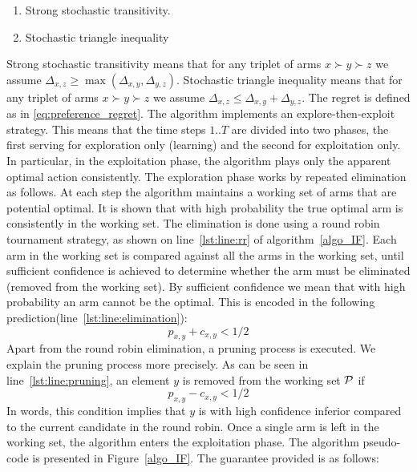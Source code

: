 \documentclass{llncs}
\begin{document}
	\begin{enumerate}

		\item Strong stochastic transitivity.

		\item Stochastic triangle inequality

	\end{enumerate}
	Strong stochastic transitivity means that for any triplet of arms $x \succ y \succ z$ we assume $\Delta_{x,z} \geq \max(\Delta_{x,y},\Delta_{y,z})$.
	Stochastic triangle inequality means that for any triplet of arms $x \succ y \succ z$ we assume $\Delta_{x,z} \leq \Delta_{x,y} + \Delta_{y,z}$.
	The regret is defined as in \eqref{eq:preference_regret}.
	The algorithm implements an explore-then-exploit strategy. 
	This means that the time steps $1..T$ are divided into two phases, the first serving for exploration only (learning) and the second for exploitation only. 
	In particular, in the exploitation phase, the algorithm plays only the apparent optimal action consistently.
	The exploration phase works by repeated elimination as follows. 
	At each step the algorithm maintains a working set of arms that are potential optimal. 
	It is shown that with high probability the true optimal arm is consistently in the working set. 
	The elimination is done using a round robin tournament strategy, as shown on line~\ref{lst:line:rr} of algorithm~\ref{algo_IF}. 
	Each arm in the working set is compared against all the arms in the working set, until sufficient confidence is achieved to determine whether the arm must be eliminated (removed from the working set). 
	By sufficient confidence we mean that with high probability an arm cannot be the optimal. This is encoded in the following prediction(line~\ref{lst:line:elimination}):
	 $$p_{x,y}+c_{x,y}<1/2$$
	Apart from the round robin elimination, a pruning process is executed.
	We explain the pruning process more precisely. 
	As can be seen in line~\ref{lst:line:pruning}, an element $y$ is removed from the working set $\cal P$ if $$p_{x,y}-c_{x,y}<1/2$$ 
	In words, this condition implies that $y$ is with high confidence inferior compared to the current candidate in the round robin.
	Once a single arm is left in the working set, the algorithm enters the exploitation phase.
	The algorithm pseudo-code is presented in Figure~\ref{algo_IF}. 
	The guarantee provided is as follows:
\end{document}
